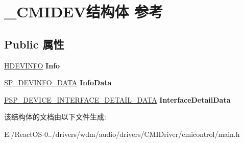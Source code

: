 \hypertarget{struct___c_m_i_d_e_v}{}\section{\+\_\+\+C\+M\+I\+D\+E\+V结构体 参考}
\label{struct___c_m_i_d_e_v}
\subsection*{Public 属性}
\begin{DoxyCompactItemize}
\item 
\mbox{\label{struct___c_m_i_d_e_v_a687f45be5eea2332e911295390efd83c}} 
\hyperlink{interfacevoid}{H\+D\+E\+V\+I\+N\+FO} {\bfseries Info}
\item 
\mbox{\label{struct___c_m_i_d_e_v_a193d4819c8aa44a623b6d3645d8ce62f}} 
\hyperlink{struct___s_p___d_e_v_i_n_f_o___d_a_t_a}{S\+P\+\_\+\+D\+E\+V\+I\+N\+F\+O\+\_\+\+D\+A\+TA} {\bfseries Info\+Data}
\item 
\mbox{\label{struct___c_m_i_d_e_v_a2a4d8954b9c52ddce843e255c0e56b27}} 
\hyperlink{struct___s_p___d_e_v_i_c_e___i_n_t_e_r_f_a_c_e___d_e_t_a_i_l___d_a_t_a___a}{P\+S\+P\+\_\+\+D\+E\+V\+I\+C\+E\+\_\+\+I\+N\+T\+E\+R\+F\+A\+C\+E\+\_\+\+D\+E\+T\+A\+I\+L\+\_\+\+D\+A\+TA} {\bfseries Interface\+Detail\+Data}
\end{DoxyCompactItemize}


该结构体的文档由以下文件生成\+:\begin{DoxyCompactItemize}
\item 
E\+:/\+React\+O\+S-\/0../drivers/wdm/audio/drivers/\+C\+M\+I\+Driver/cmicontrol/main.\+h\end{DoxyCompactItemize}
